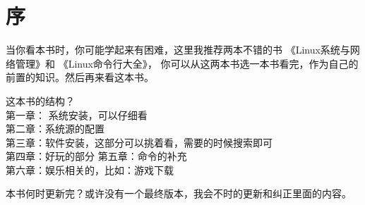\chapter{序}

当你看本书时，你可能学起来有困难，这里我推荐两本不错的书 《Linux系统与网络管理》和 《Linux命令行大全》\citet{book1}，
你可以从这两本书选一本书看完，作为自己的前置的知识。然后再来看这本书。


这本书的结构？\\
第一章： 系统安装，可以仔细看\\
第二章：系统源的配置\\
第三章：软件安装，这部分可以挑着看，需要的时候搜索即可\\
第四章：好玩的部分
第五章：命令的补充\\
第六章：娱乐相关的，比如：游戏下载

本书何时更新完？或许没有一个最终版本，我会不时的更新和纠正里面的内容。
